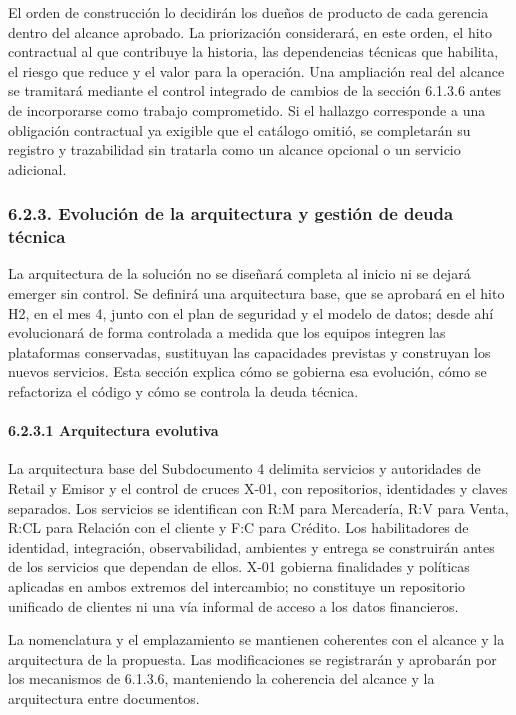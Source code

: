 \documentclass[11pt]{article}
\begin{document}
El orden de construcción lo decidirán los dueños de producto de cada
gerencia dentro del alcance aprobado. La priorización considerará, en
este orden, el hito contractual al que contribuye la historia, las
dependencias técnicas que habilita, el riesgo que reduce y el valor para
la operación. Una ampliación real del alcance se tramitará mediante el
control integrado de cambios de la sección 6.1.3.6 antes de incorporarse
como trabajo comprometido. Si el hallazgo corresponde a una obligación
contractual ya exigible que el catálogo omitió, se completarán su
registro y trazabilidad sin tratarla como un alcance opcional o un
servicio adicional.

\subsubsection{6.2.3. Evolución de la arquitectura y gestión de deuda técnica}\label{6-2-3-evolucion-de-la-arquitectura-y-gestion-de-deuda-tecnica}

La arquitectura de la solución no se diseñará completa al inicio ni se dejará emerger sin control. Se definirá una arquitectura base, que se aprobará en el hito H2, en el mes 4, junto con el plan de seguridad y el modelo de datos; desde ahí evolucionará de forma controlada a medida que los equipos integren las plataformas conservadas, sustituyan las capacidades previstas y construyan los nuevos servicios. Esta sección explica cómo se gobierna esa evolución, cómo se refactoriza el código y cómo se controla la deuda técnica.

\paragraph{6.2.3.1 Arquitectura evolutiva}\label{6-2-3-1-arquitectura-evolutiva}

La arquitectura base del Subdocumento 4 delimita servicios y autoridades de Retail y Emisor y el control de cruces X-01, con repositorios, identidades y claves separados. Los servicios se identifican con R:M para Mercadería, R:V para Venta, R:CL para Relación con el cliente y F:C para Crédito. Los habilitadores de identidad, integración, observabilidad, ambientes y entrega se construirán antes de los servicios que dependan de ellos. X-01 gobierna finalidades y políticas aplicadas en ambos extremos del intercambio; no constituye un repositorio unificado de clientes ni una vía informal de acceso a los datos financieros.

La nomenclatura y el emplazamiento se mantienen coherentes con el
alcance y la arquitectura de la propuesta. Las modificaciones se
registrarán y aprobarán por los mecanismos de 6.1.3.6, manteniendo la
coherencia del alcance y la arquitectura entre documentos.
\end{document}

